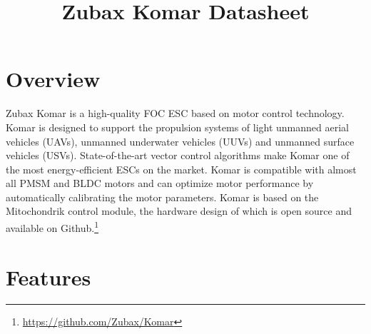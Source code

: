 \documentclass{zubaxdoc}
\title{Zubax Komar Datasheet}
\begin{document}
\frontmatter
\begin{titlepage}

\section*{Overview}

Zubax Komar is a high-quality FOC ESC based on  motor control technology. Komar is designed to
support the propulsion systems of light unmanned aerial vehicles (UAVs), unmanned underwater vehicles (UUVs)
and unmanned surface vehicles (USVs). State-of-the-art vector control algorithms make Komar one of the most
energy-efficient ESCs on the market. Komar is compatible with almost all PMSM and BLDC motors and can
optimize motor performance by automatically calibrating the motor parameters. Komar is based
on the Mitochondrik control module, the hardware design of which is open source and available on
Github.\footnote{\url{https://github.com/Zubax/Komar}}


\section*{Features}


\end{titlepage}
\end{document}
